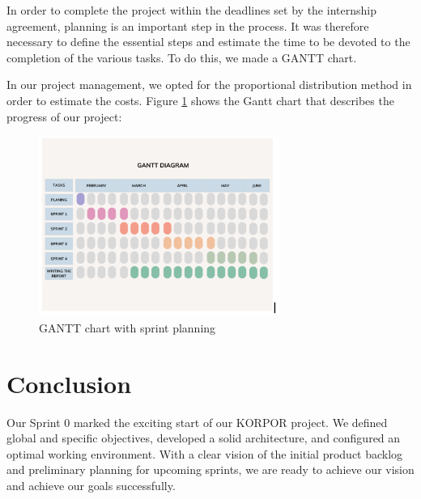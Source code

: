 In order to complete the project within the deadlines set by the internship agreement, planning is an important step in the process. It was therefore necessary to define the essential steps and estimate the time to be devoted to the completion of the various tasks. To do this, we made a GANTT chart.

In our project management, we opted for the proportional distribution method in order to estimate the costs.
Figure \ref{fig:gantt-chart} shows the Gantt chart that describes the progress of our project:

\vspace{1cm}

\begin{figure}[htbp]
    \centering
    \includegraphics[width=0.7\textwidth]{images/gantt-chart.png}
    \caption{GANTT chart with sprint planning}
    \label{fig:gantt-chart}
\end{figure}


\section{Conclusion}

Our Sprint 0 marked the exciting start of our KORPOR project. We defined global and specific objectives, developed a solid architecture, and configured an optimal working environment. With a clear vision of the initial product backlog and preliminary planning for upcoming sprints, we are ready to achieve our vision and achieve our goals successfully.